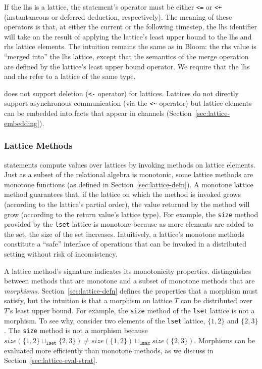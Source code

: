 If the lhs is a lattice, the statement's operator must be either \verb|<=| or
\verb|<+| (instantaneous or deferred deduction, respectively). The meaning of
these operators is that, at either the current or the following timestep, the lhs
identifier will take on the result of applying the lattice's least upper bound
to the lhs and rhs lattice elements. The intuition remains the same as in Bloom:
the rhs value is ``merged into'' the lhs lattice, except that the semantics of
the merge operation are defined by the lattice's least upper bound operator. We
require that the lhs and rhs refer to a lattice of the same type.

\lang does not support deletion (\verb|<-| operator) for lattices. Lattices do
not directly support asynchronous communication (via the \verb|<~| operator) but
lattice elements can be embedded into facts that appear in channels
(Section~\ref{sec:lattice-embedding}).

\subsubsection{Lattice Methods}
\lang statements compute values over lattices by invoking methods on lattice
elements. Just as a subset of the relational algebra is monotonic, some lattice
methods are monotone functions (as defined in Section~\ref{sec:lattice-defn}). A
monotone lattice method guarantees that, if the lattice on which the method is
invoked grows (according to the lattice's partial order), the value returned by
the method will grow (according to the return value's lattice type). For
example, the \texttt{size} method provided by the \texttt{lset} lattice is
monotone because as more elements are added to the set, the size of the set
increases. Intuitively, a lattice's monotone methods constitute a ``safe''
interface of operations that can be invoked in a distributed setting without
risk of inconsistency.

A lattice method's signature indicates its monotonicity properties. \lang
distinguishes between methods that are monotone and a subset of monotone methods
that are \emph{morphisms}. Section~\ref{sec:lattice-defn} defines the properties
that a morphism must satisfy, but the intuition is that a morphism on lattice
$T$ can be distributed over $T$'s least upper bound. For example, the
\texttt{size} method of the \texttt{lset} lattice is not a morphism. To see why,
consider two elements of the \texttt{lset} lattice, $\{1,2\}$ and $\{2,3\}$.
The \texttt{size} method is not a morphism because $size(\{1,2\}
\sqcup_{\mathtt{lset}} \{2,3\}) \ne size(\{1,2\}) \sqcup_{\mathtt{lmax}}
size(\{2,3\})$. Morphisms can be evaluated more efficiently than monotone
methods, as we discuss in Section~\ref{sec:lattice-eval-strat}.

